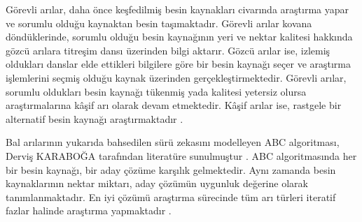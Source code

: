 \documentclass[conference]{IEEEtran}
\begin{document}
Görevli arılar, daha önce keşfedilmiş besin kaynakları civarında araştırma yapar ve sorumlu olduğu kaynaktan besin taşımaktadır. Görevli arılar kovana döndüklerinde, sorumlu olduğu besin kaynağının yeri ve nektar kalitesi hakkında gözcü arılara titreşim dansı üzerinden bilgi aktarır. Gözcü arılar ise, izlemiş oldukları danslar elde ettikleri bilgilere göre bir besin kaynağı seçer ve araştırma işlemlerini seçmiş olduğu kaynak üzerinden gerçekleştirmektedir. Görevli arılar, sorumlu oldukları besin kaynağı tükenmiş yada kalitesi yetersiz olursa araştırmalarına kâşif arı olarak devam etmektedir. Kâşif arılar ise, rastgele bir alternatif besin kaynağı araştırmaktadır \cite{karaboga2007powerful,karaboga2009comparative,aslan2019time,gao2012modified,zhu2010gbest}.

Bal arılarının yukarıda bahsedilen sürü zekasını modelleyen ABC algoritması, Derviş KARABOĞA tarafından literatüre sunulmuştur \cite{karaboga2005idea}. ABC algoritmasında her bir besin kaynağı, bir aday çözüme karşılık gelmektedir. Aynı zamanda besin kaynaklarının nektar miktarı, aday çözümün uygunluk değerine olarak tanımlanmaktadır. En iyi çözümü araştırma sürecinde tüm arı türleri iteratif fazlar halinde araştırma yapmaktadır \cite{karaboga2007powerful,karaboga2009comparative,aslan2019time,gao2012modified,zhu2010gbest}.

\end{document}
